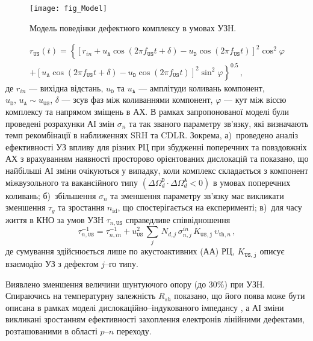 \documentclass[a5paper,10pt,twoside,openany,article]{memoir} %
\begin{document}
\begin{figure}[ht]
\center
\texttt{[image: fig\_Model]}
\caption{\label{fig_Model}
Модель поведінки дефектного комплексу в умовах УЗН.
}%
\end{figure}

\begin{multline}
\label{eqrUS}
r_\mathtt{US}(t)=\left\{[r_{in}+u_\mathtt{A}\cos(2\pi f_\mathtt{US}t+\delta)-u_\mathtt{D}\cos(2\pi f_\mathtt{US}t)]^2\cos^2\varphi \right.\\
    \left.+ [u_\mathtt{A}\cos(2\pi f_\mathtt{US}t+\delta)-u_\mathtt{D}\cos(2\pi f_\mathtt{US}t)]^2\sin^2\varphi\right\}^{0.5}\,,
\end{multline}
де
$r_{in}$ --- вихідна відстань,
$u_\mathtt{D}$ та $u_\mathtt{A}$ --- амплітуди коливань компонент, $u_\mathtt{D},\,u_\mathtt{A}\sim u_\mathtt{US}$,
$\delta$ --- зсув фаз між коливаннями компонент,
$\varphi$ --- кут між віссю комплексу та напрямом зміщень в АХ.
В рамках запропонованої моделі були проведені розрахунки АІ змін $\sigma_{n}$ та так званого параметру зв'язку,
які визначають темп рекомбінації в наближеннях SRH та  CDLR.
Зокрема,
а)~проведено аналіз ефективності УЗ впливу для різних РЦ при збудженні поперечних та повздовжніх АХ з врахуванням наявності просторово орієнтованих дислокацій та показано, що найбільші АІ зміни очікуються у випадку, коли комплекс складається з компонент міжвузольного та вакансійного типу $(\Delta\Omega_d^\mathtt{D}\cdot\Delta\Omega_d^\mathtt{A}<0)$
 в умовах поперечних коливань;
б)~збільшення $\sigma_{n}$ та зменшення параметру зв'язку має викликати зменшення $\tau_g$ та зростання $n_\mathrm{id}$, що спостерігається на експерименті;
в)~для часу життя в КНО за умов УЗН $\tau_{n,\mathtt{US}}$ справедливе співвідношення
\begin{equation}
\label{eqEpsSigUSA}
\tau_{n,\mathtt{US}}^{-1}=
\tau_{n,in}^{-1}+u_{\mathtt{US}}^2\,\sum_j\,N_{d,j}\,\sigma_{n,j}^{in}\,K_\mathtt{US,j}\,\upsilon_{\mathrm{th},n}\,,
\end{equation}
де
сумування здійснюється лише по акустоактивних (АА) РЦ,
$K_\mathtt{US,j}$ описує взаємодію УЗ з дефектом $j$--го типу.

Виявлено зменшення величини шунтуючого опору (до 30\%) при УЗН.
Спираючись на температурну залежність $R_{sh}$ показано, що його поява може бути описана в рамках моделі дислокаційно--індукованого імпедансу \cite{Rsh:Gopal2004}, а АІ зміни викликані зростанням ефективності захоплення електронів лінійними дефектами, розташованими в області $p$--$n$ переходу.
\end{document}
